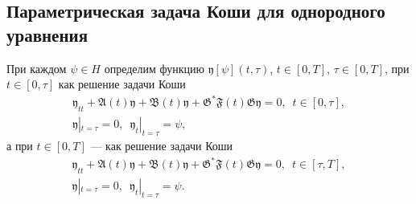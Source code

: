 \documentclass{report}
\begin{document}
	    \subsection{Параметрическая задача Коши для однородного уравнения}
При каждом $\psi\in H$ определим функцию $\mathfrak{y}[\psi](t,\tau)$, $t\in[0,T]$, $\tau\in[0,T]$, при $t\in[0,\tau]$ как решение задачи Коши
\begin{gather}\label{abstrChauchyprobeq:nonaut:parametric:homogenious.eq!t.less.than.tau}
{\mathfrak{y}}_{tt}+\mathfrak{A}(t){\mathfrak{y}}+\mathfrak{B}(t){\mathfrak{y}} + \mathfrak{G}^*\mathfrak{F}(t)\mathfrak{G}{\mathfrak{y}} = 0,\,\,\,t\in[0,\tau],\\
\label{abstrChauchyprobinitcond:nonaut:parametric:homogenious.eq!t.less.than.tau}
{\mathfrak{y}}|_{t=\tau}=0,\,\,\,{\mathfrak{y}}_t|_{t=\tau}=\psi,
\end{gather}
а при $t\in[0,T]$ --- как решение задачи Коши
\begin{gather}\label{abstrChauchyprobeq:nonaut:parametric:homogenious.eq!t.greater.than.tau}
{\mathfrak{y}}_{tt}+\mathfrak{A}(t){\mathfrak{y}}+\mathfrak{B}(t){\mathfrak{y}} + \mathfrak{G}^*\mathfrak{F}(t)\mathfrak{G}{\mathfrak{y}} = 0,\,\,\,t\in[\tau,T],\\
\label{abstrChauchyprobinitcond:nonaut:parametric:homogenious.eq!t.greater.than.tau}
{\mathfrak{y}}|_{t=\tau}=0,\,\,\,{\mathfrak{y}}_t|_{t=\tau}=\psi.
\end{gather}
	    
\end{document}
